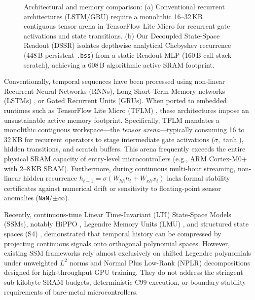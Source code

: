 \documentclass[10pt,twocolumn,a4paper]{article}
\theoremstyle{plain}
\theoremstyle{definition}
\begin{document}
\begin{figure}[t]
{%
}
\caption{Architectural and memory comparison: (a) Conventional recurrent architectures (LSTM/GRU) require a monolithic 16--32\,KB contiguous tensor arena in TensorFlow Lite Micro for recurrent gate activations and state transitions. (b) Our Decoupled State-Space Readout (DSSR) isolates depthwise analytical Chebyshev recurrence (448\,B persistent \texttt{.bss}) from a static Readout MLP (160\,B call-stack scratch), achieving a 608\,B algorithmic active SRAM footprint.}
\label{fig:architecture}
\end{figure}

Conventionally, temporal sequences have been processed using non-linear Recurrent Neural Networks (RNNs), Long Short-Term Memory networks (LSTMs) \cite{hochreiter1997long}, or Gated Recurrent Units (GRUs). When ported to embedded runtimes such as TensorFlow Lite Micro (TFLM) \cite{david2021tensorflow}, these architectures impose an unsustainable active memory footprint. Specifically, TFLM mandates a monolithic contiguous workspace---the \textit{tensor arena}---typically consuming 16 to 32\,KB for recurrent operators to stage intermediate gate activations ($\sigma, \tanh$), hidden transitions, and scratch buffers. This arena frequently exceeds the entire physical SRAM capacity of entry-level microcontrollers (e.g., ARM Cortex-M0+ with 2--8\,KB SRAM). Furthermore, during continuous multi-hour streaming, non-linear hidden recurrence $h_{t+1} = \sigma(W_{hh} h_t + W_{xh} x_t)$ lacks formal stability certificates against numerical drift or sensitivity to floating-point sensor anomalies (\texttt{NaN}/$\pm\infty$).

Recently, continuous-time Linear Time-Invariant (LTI) State-Space Models (SSMs), notably HiPPO \cite{gu2020hippo}, Legendre Memory Units (LMU) \cite{voelker2019legendre}, and structured state spaces (S4) \cite{gu2022s4}, demonstrated that temporal history can be compressed by projecting continuous signals onto orthogonal polynomial spaces. However, existing SSM frameworks rely almost exclusively on shifted Legendre polynomials under unweighted $L^2$ norms and Normal Plus Low-Rank (NPLR) decompositions designed for high-throughput GPU training. They do not address the stringent sub-kilobyte SRAM budgets, deterministic C99 execution, or boundary stability requirements of bare-metal microcontrollers.
\end{document}
